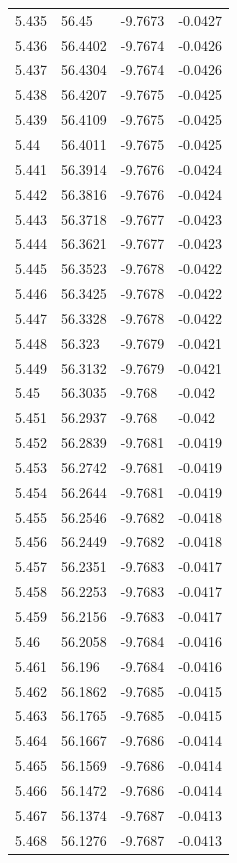 \begin{tabular}{llll}
5.435 & 56.45 & -9.7673 & -0.0427 \\
5.436 & 56.4402 & -9.7674 & -0.0426 \\
5.437 & 56.4304 & -9.7674 & -0.0426 \\
5.438 & 56.4207 & -9.7675 & -0.0425 \\
5.439 & 56.4109 & -9.7675 & -0.0425 \\
5.44 & 56.4011 & -9.7675 & -0.0425 \\
5.441 & 56.3914 & -9.7676 & -0.0424 \\
5.442 & 56.3816 & -9.7676 & -0.0424 \\
5.443 & 56.3718 & -9.7677 & -0.0423 \\
5.444 & 56.3621 & -9.7677 & -0.0423 \\
5.445 & 56.3523 & -9.7678 & -0.0422 \\
5.446 & 56.3425 & -9.7678 & -0.0422 \\
5.447 & 56.3328 & -9.7678 & -0.0422 \\
5.448 & 56.323 & -9.7679 & -0.0421 \\
5.449 & 56.3132 & -9.7679 & -0.0421 \\
5.45 & 56.3035 & -9.768 & -0.042 \\
5.451 & 56.2937 & -9.768 & -0.042 \\
5.452 & 56.2839 & -9.7681 & -0.0419 \\
5.453 & 56.2742 & -9.7681 & -0.0419 \\
5.454 & 56.2644 & -9.7681 & -0.0419 \\
5.455 & 56.2546 & -9.7682 & -0.0418 \\
5.456 & 56.2449 & -9.7682 & -0.0418 \\
5.457 & 56.2351 & -9.7683 & -0.0417 \\
5.458 & 56.2253 & -9.7683 & -0.0417 \\
5.459 & 56.2156 & -9.7683 & -0.0417 \\
5.46 & 56.2058 & -9.7684 & -0.0416 \\
5.461 & 56.196 & -9.7684 & -0.0416 \\
5.462 & 56.1862 & -9.7685 & -0.0415 \\
5.463 & 56.1765 & -9.7685 & -0.0415 \\
5.464 & 56.1667 & -9.7686 & -0.0414 \\
5.465 & 56.1569 & -9.7686 & -0.0414 \\
5.466 & 56.1472 & -9.7686 & -0.0414 \\
5.467 & 56.1374 & -9.7687 & -0.0413 \\
5.468 & 56.1276 & -9.7687 & -0.0413 \\

\end{tabular}
